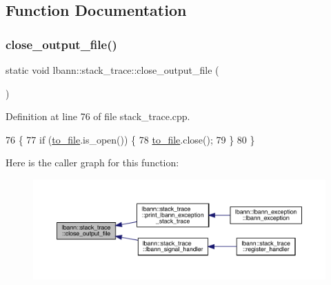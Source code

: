\subsection{Function Documentation}
\mbox{\label{namespacelbann_1_1stack__trace_a45e4398bd4d0a7b9956107192a342b89}} 
\subsubsection{\texorpdfstring{close\+\_\+output\+\_\+file()}{close\_output\_file()}}
{\footnotesize\ttfamily static void lbann\+::stack\+\_\+trace\+::close\+\_\+output\+\_\+file (\begin{DoxyParamCaption}{ }\end{DoxyParamCaption})\hspace{0.3cm}{\ttfamily [static]}}



Definition at line 76 of file stack\+\_\+trace.\+cpp.


\begin{DoxyCode}
76                                 \{
77   \textcolor{keywordflow}{if} (\hyperlink{namespacelbann_1_1stack__trace_a6c838c74fec7cc57e5ccad283a8d282b}{to\_file}.is\_open()) \{
78     \hyperlink{namespacelbann_1_1stack__trace_a6c838c74fec7cc57e5ccad283a8d282b}{to\_file}.close();
79   \}
80 \}
\end{DoxyCode}
Here is the caller graph for this function\+:\nopagebreak
\begin{figure}[H]
\begin{center}
\leavevmode
\includegraphics[width=350pt]{namespacelbann_1_1stack__trace_a45e4398bd4d0a7b9956107192a342b89_icgraph}
\end{center}
\end{figure}
\mbox{\label{namespacelbann_1_1stack__trace_a4bf58556b9c42ac8930c273a921172de}} 
